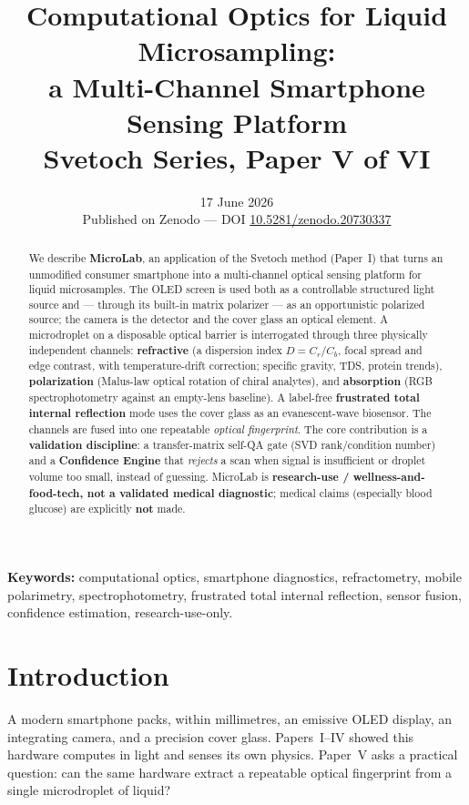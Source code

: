 \documentclass[11pt]{article}
\title{\textbf{Computational Optics for Liquid Microsampling:\\
a Multi-Channel Smartphone Sensing Platform}\\[4pt]
{\large Svetoch Series, Paper V of VI}}
\author{\svetochauthor}
\date{17 June 2026\\[2pt]{\normalsize Published on Zenodo --- DOI \href{https://doi.org/10.5281/zenodo.20730337}{10.5281/zenodo.20730337}}}
\begin{document}
\maketitle

\begin{abstract}
\noindent We describe \textbf{MicroLab}, an application of the Svetoch method (Paper~I) that
turns an unmodified consumer smartphone into a multi-channel optical sensing platform for
liquid microsamples. The OLED screen is used both as a controllable structured light source
and --- through its built-in matrix polarizer --- as an opportunistic polarized source; the
camera is the detector and the cover glass an optical element. A microdroplet on a disposable
optical barrier is interrogated through three physically independent channels: \textbf{refractive}
(a dispersion index $D=C_r/C_b$, focal spread and edge contrast, with temperature-drift
correction; specific gravity, TDS, protein trends), \textbf{polarization} (Malus-law optical
rotation of chiral analytes), and \textbf{absorption} (RGB spectrophotometry against an
empty-lens baseline). A label-free \textbf{frustrated total internal reflection} mode uses the
cover glass as an evanescent-wave biosensor. The channels are fused into one repeatable
\emph{optical fingerprint}. The core contribution is a \textbf{validation discipline}: a
transfer-matrix self-QA gate (SVD rank/condition number) and a \textbf{Confidence Engine} that
\emph{rejects} a scan when signal is insufficient or droplet volume too small, instead of
guessing. MicroLab is \textbf{research-use / wellness-and-food-tech, not a validated medical
diagnostic}; medical claims (especially blood glucose) are explicitly \textbf{not} made.
\end{abstract}

\noindent\textbf{Keywords:} computational optics, smartphone diagnostics, refractometry,
mobile polarimetry, spectrophotometry, frustrated total internal reflection, sensor fusion,
confidence estimation, research-use-only.

\section{Introduction}
A modern smartphone packs, within millimetres, an emissive OLED display, an integrating
camera, and a precision cover glass. Papers~I--IV showed this hardware computes in light and
senses its own physics. Paper~V asks a practical question: can the same hardware extract a
repeatable optical fingerprint from a single microdroplet of liquid?
\end{document}
